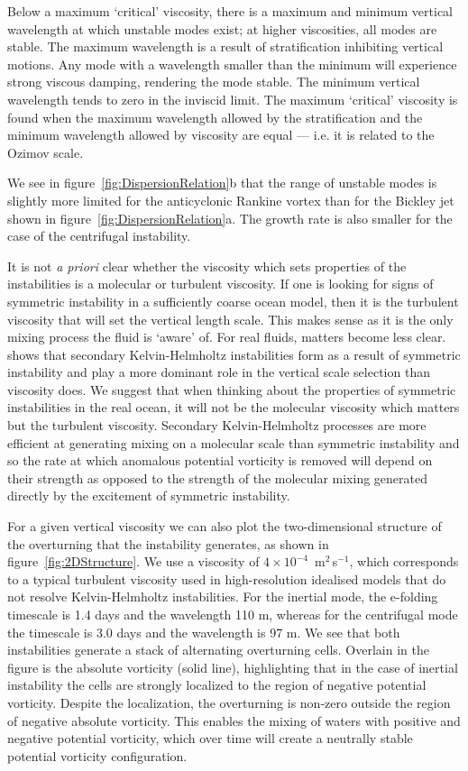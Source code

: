 Below a maximum `critical' viscosity, there is a maximum and minimum vertical wavelength at which unstable modes exist; at higher viscosities, all modes are stable. The maximum wavelength is a result of stratification inhibiting vertical motions. Any mode with a wavelength smaller than the minimum will experience strong viscous damping, rendering the mode stable. The minimum vertical wavelength tends to zero in the inviscid limit. The maximum `critical' viscosity is found when the maximum wavelength allowed by the stratification and the minimum wavelength allowed by viscosity are equal --- i.e. it is related to the Ozimov scale.

We see in figure~\ref{fig:DispersionRelation}b that the range of unstable modes is slightly more limited for the anticyclonic Rankine vortex than for the Bickley jet shown in figure~\ref{fig:DispersionRelation}a. The growth rate is also smaller for the case of the centrifugal instability.

It is not \textit{a priori} clear whether the viscosity which sets properties of the instabilities is a molecular or turbulent viscosity. If one is looking for signs of symmetric instability in a sufficiently coarse ocean model, then it is the turbulent viscosity that will set the vertical length scale. This makes sense as it is the only mixing process the fluid is `aware' of. For real fluids, matters become less clear. \citet{Griffiths2003a} shows that secondary Kelvin-Helmholtz instabilities form as a result of symmetric instability and play a more dominant role in the vertical scale selection than viscosity does. We suggest that when thinking about the properties of symmetric instabilities in the real ocean, it will not be the molecular viscosity which matters but the turbulent viscosity. Secondary Kelvin-Helmholtz processes are more efficient at generating mixing on a molecular scale than symmetric instability and so the rate at which anomalous potential vorticity is removed will depend on their strength as opposed to the strength of the molecular mixing generated directly by the excitement of symmetric instability.

For a given vertical viscosity we can also plot the two-dimensional structure of the overturning that the instability generates, as shown in figure~\ref{fig:2DStructure}. We use a viscosity of $4 \times 10 ^{-4}$~m$^2$\,s$^{-1}$, which corresponds to a typical turbulent viscosity used in high-resolution idealised models that do not resolve Kelvin-Helmholtz instabilities. For the inertial mode, the e-folding timescale is 1.4 days and the wavelength 110 m, whereas for the centrifugal mode the timescale is 3.0 days and the wavelength is 97 m. We see that both instabilities generate a stack of alternating overturning cells. Overlain in the figure is the absolute vorticity (solid line), highlighting that in the case of inertial instability the cells are strongly localized to the region of negative potential vorticity. Despite the localization, the overturning is non-zero outside the region of negative absolute vorticity. This enables the mixing of waters with positive and negative potential vorticity, which over time will create a neutrally stable potential vorticity configuration.

